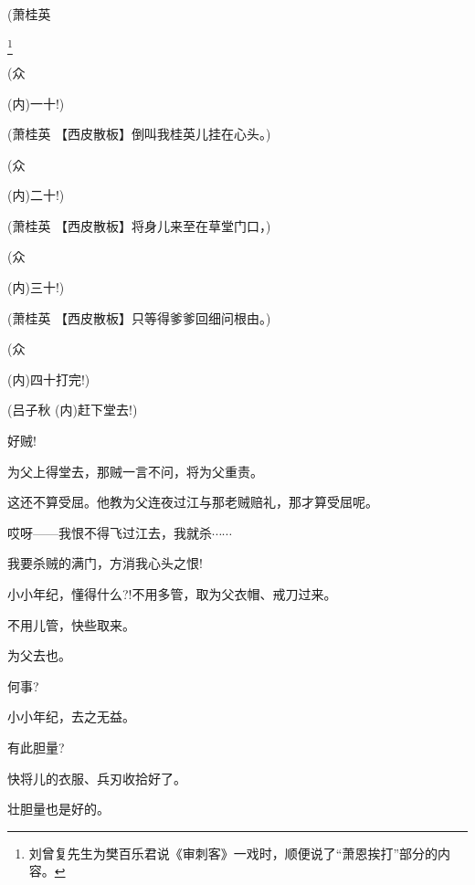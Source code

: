 {{(萧桂英

\footnote{刘曾复先生为樊百乐君说《审刺客》一戏时，顺便说了``萧恩挨打''部分的内容。} }

{(众\hspace{40pt}~

({\akai 内})一十!)}

{(萧桂英 【{\akai 西皮散板}】倒叫我桂英儿挂在心头。)}

{(众\hspace{40pt}~

({\akai 内})二十!)}

{(萧桂英 【{\akai 西皮散板}】将身儿来至在草堂门口，)}

{(众\hspace{40pt}~

({\akai 内})三十!)}

{(萧桂英 【{\akai 西皮散板}】只等得爹爹回细问根由。)}

{(众\hspace{40pt}~

({\akai 内})四十打完!)}

{(吕子秋 ({\akai 内})赶下堂去!)}

{好贼!}\hspace{20pt}~



{为父上得堂去，那贼一言不问，将为父重责。}

{这还不算受屈。他教为父连夜过江与那老贼赔礼，那才算受屈呢。}

{哎呀------我恨不得飞过江去，我就杀$\cdots{}\cdots{}$}

{我要杀贼的满门，方消我心头之恨!}

{小小年纪，懂得什么?!不用多管，取为父衣帽、戒刀过来。}

{不用儿管，快些取来。}

{为父去也。}

{何事?}\hspace{20pt}~

{小小年纪，去之无益。}

{有此胆量?}

{快将儿的衣服、兵刃收拾好了。}

{壮胆量也是好的。}

}

